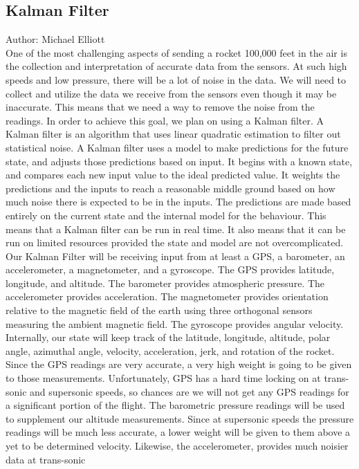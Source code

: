 \documentclass[onecolumn, draftclsnofoot,10pt, compsoc]{IEEEtran}
\begin{document}
\subsection{Kalman Filter}
Author: Michael Elliott\\
One of the most challenging aspects of sending a rocket 100,000 feet
in the air is the collection and interpretation of accurate data from
the sensors.
At such high speeds and low pressure, there will be a lot of noise in the data.
We will need to collect and utilize the data we receive from the
sensors even though it may be inaccurate.
This means that we need a way to remove the noise from the readings.
In order to achieve this goal, we plan on using a Kalman filter.
A Kalman filter is an algorithm that uses linear quadratic estimation
to filter out statistical noise.
A Kalman filter uses a model to make predictions for the future state,
and adjusts those predictions based on input.
It begins with a known state, and compares each new input value to the
ideal predicted value.
It weights the predictions and the inputs to reach a reasonable middle
ground based on how much noise there is expected to be in the inputs.
The predictions are made based entirely on the current state and the
internal model for the behaviour.
This means that a Kalman filter can be run in real time.
It also means that it can be run on limited resources provided the
state and model are not overcomplicated.
Our Kalman Filter will be receiving input from at least a GPS, a
barometer, an accelerometer, a magnetometer, and a gyroscope.
The GPS provides latitude, longitude, and altitude.
The barometer provides atmospheric pressure.
The accelerometer provides acceleration.
The magnetometer provides orientation relative to the magnetic field
of the earth using three orthogonal sensors measuring the ambient
magnetic field.
The gyroscope provides angular velocity.
Internally, our state will keep track of the latitude, longitude,
altitude, polar angle, azimuthal angle, velocity, acceleration, jerk,
and rotation of the rocket.
Since the GPS readings are very accurate, a very high weight is going
to be given to those measurements.
Unfortunately, GPS has a hard time locking on at trans-sonic and
supersonic speeds, so chances are we will not get any GPS readings for
a significant portion of the flight.
The barometric pressure readings will be used to supplement our
altitude measurements.
Since at supersonic speeds the pressure readings will be much less
accurate, a lower weight will be given to them above a yet to be
determined velocity.
Likewise, the accelerometer, provides much noisier data at trans-sonic
\end{document}
